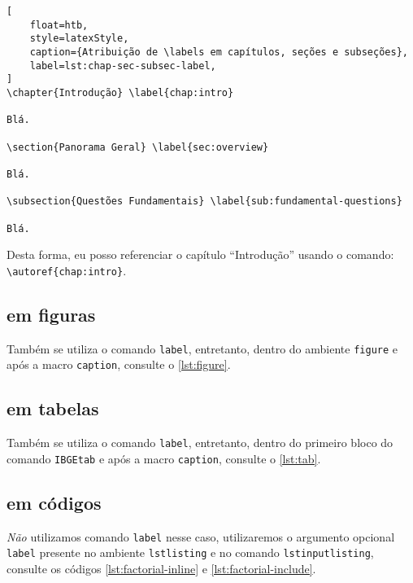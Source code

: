 \begin{lstlisting}[
    float=htb, 
    style=latexStyle, 
    caption={Atribuição de \labels em capítulos, seções e subseções},
    label=lst:chap-sec-subsec-label,
]
\chapter{Introdução} \label{chap:intro}

Blá.

\section{Panorama Geral} \label{sec:overview}

Blá.

\subsection{Questões Fundamentais} \label{sub:fundamental-questions}

Blá.
\end{lstlisting}

Desta forma, eu posso referenciar o capítulo \enquote{Introdução} usando o comando: \texttt{\textbackslash autoref\{chap:intro\}}.

\subsection{\Labels em figuras}

Também se utiliza o comando \texttt{label}, entretanto, dentro do ambiente \texttt{figure} e após a macro \texttt{caption}, consulte o \autoref{lst:figure}.

\subsection{\Labels em tabelas}

Também se utiliza o comando \texttt{label}, entretanto, dentro do primeiro bloco do comando \texttt{IBGEtab} e após a macro \texttt{caption}, consulte o \autoref{lst:tab}.

\subsection{\Labels em códigos}

\emph{Não} utilizamos comando \texttt{label} nesse caso, utilizaremos o argumento opcional \texttt{label} presente no ambiente \texttt{lstlisting} e no comando \texttt{lstinputlisting}, consulte os códigos \ref{lst:factorial-inline} e \ref{lst:factorial-include}.

